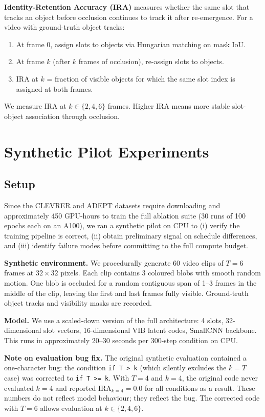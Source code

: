 \documentclass{article}
\begin{document}
\textbf{Identity-Retention Accuracy (IRA)} measures whether the same slot
that tracks an object before occlusion continues to track it after
re-emergence.
For a video with ground-truth object tracks:
\begin{enumerate}
  \item At frame 0, assign slots to objects via Hungarian matching on mask IoU.
  \item At frame $k$ (after $k$ frames of occlusion), re-assign slots to objects.
  \item IRA at $k$ = fraction of visible objects for which the same slot index
        is assigned at both frames.
\end{enumerate}
We measure IRA at $k \in \{2, 4, 6\}$ frames.
Higher IRA means more stable slot-object association through occlusion.


\section{Synthetic Pilot Experiments}

\subsection{Setup}

Since the CLEVRER and ADEPT datasets require downloading and approximately
450 GPU-hours to train the full ablation suite (30 runs of 100 epochs each
on an A100), we ran a synthetic pilot on CPU to (i) verify the training
pipeline is correct, (ii) obtain preliminary signal on schedule differences,
and (iii) identify failure modes before committing to the full compute budget.

\textbf{Synthetic environment.}
We procedurally generate 60 video clips of $T=6$ frames at $32 \times 32$ pixels.
Each clip contains 3 coloured blobs with smooth random motion.
One blob is occluded for a random contiguous span of 1--3 frames in the middle
of the clip, leaving the first and last frames fully visible.
Ground-truth object tracks and visibility masks are recorded.

\textbf{Model.}
We use a scaled-down version of the full architecture:
4 slots, 32-dimensional slot vectors, 16-dimensional VIB latent codes,
SmallCNN backbone.
This runs in approximately 20--30 seconds per 300-step condition on CPU.

\textbf{Note on evaluation bug fix.}
The original synthetic evaluation contained a one-character bug:
the condition \texttt{if T > k} (which silently excludes the $k=T$ case)
was corrected to \texttt{if T >= k}.
With $T=4$ and $k=4$, the original code never evaluated $k=4$ and reported
$\text{IRA}_{k=4} = 0.0$ for all conditions as a result.
These numbers do not reflect model behaviour; they reflect the bug.
The corrected code with $T=6$ allows evaluation at $k \in \{2, 4, 6\}$.
\end{document}
